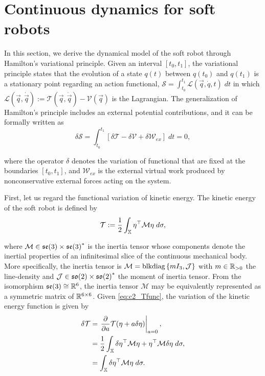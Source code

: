 \section{Continuous dynamics for soft robots}
In this section, we derive the dynamical model of the soft robot through Hamilton's variational principle. Given an interval $[t_0,t_1]$, the variational principle states that the evolution of a state $q(t)$ between $q(t_0)$ and $q(t_1)$ is a stationary point regarding an action functional, $\mathcal{S} = \int_{t_0}^{t_1} \mathcal{L}(\vec{q},\dot{q},t) \; dt$ in which $\mathcal{L}(\vec{q},\dot{\vec{q}}) := \mathcal{T}(\vec{q},\dot{\vec{q}}) - \mathcal{V}(\vec{q})$ is the Lagrangian. The generalization of Hamilton's principle \cite{Boyer2010} includes an external potential contributions, and it can be formally written as
\begin{equation} 
\delta\mathcal{S} = \int_{t_0}^{t_1} \left[\delta\mathcal{T} - \delta\mathcal{V} + \delta\mathcal{W}_{ex} \right]\; dt = 0,
\label{eq:varprinc}
\end{equation}

\noindent where the operator $\delta$ denotes the variation of functional that are fixed at the boundaries $[t_0,t_1]$, and $\mathcal{W}_{ex}$ is the external virtual work produced by nonconservative external forces acting on the system. 

First, let us regard the functional variation of kinetic energy. The kinetic energy of the soft robot is defined by  
\begin{equation}
\mathcal{T} := \frac{1}{2}\int_{\Xs} \vec{\eta}^\tr \mathcal{M} \vec{\eta}\;d\sigma, \label{eq:c2_Tfunc} 
\end{equation}

\noindent where $\mathcal{M} \in \se{3} \times \se{3}^* $ is the inertia tensor whose components denote the inertial properties of an infinitesimal slice of the continuous mechanical body. More specifically, the inertia tensor is $\mathcal{M} = \blkdiag{mI_3,\mathcal{J}}$ with $m \in \Rsp$ the line-density and $\mathcal{J} \in \sog{3} \times \sog{3}^* $ the moment of inertia tensor. From the isomorphism $\se{3} \cong \R^6$, the inertia tensor $\mathcal{M}$ may be equivalently represented as a symmetric matrix of $\R^{6\times6}$. Given \eqref{eq:c2_Tfunc}, the variation of the kinetic energy function is given by 
\begin{align}
\delta\mathcal{T} & = \left. \frac{\p }{\p a} \mathcal{T}(\vec{\eta} + a \delta\vec{\eta}) \right|_{a = 0}, \notag \\
& = \frac{1}{2} \int_{\Xs} \delta\vec{\eta}^\tr \mathcal{M}  \vec{\eta} + \vec{\eta}^\tr \mathcal{M} \delta\vec{\eta} \; d\sigma, \notag \\
& = \int_{\Xs} \delta\vec{\eta}^\tr \mathcal{M}  \vec{\eta} \; d\sigma. \label{eq:c2_varham_T}
\end{align}

